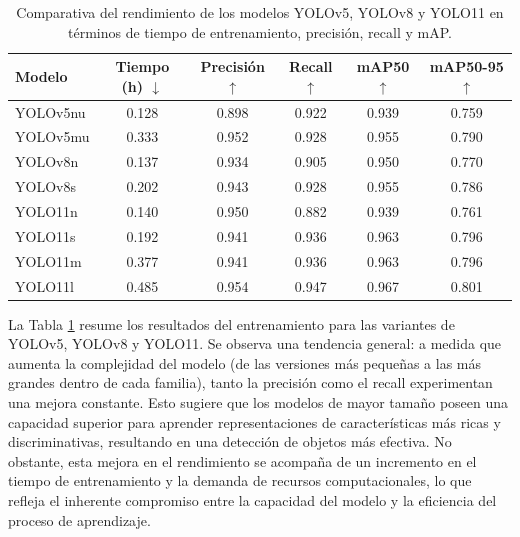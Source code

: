 \documentclass[11pt,spanish,listoffigures,listoftables]{tfgetsinf}
\begin{document}
\begin{table}[H]
   \centering
   \begin{tabular}{l | c | c | c | c | c}
      \toprule
      Modelo & Tiempo (h) $\downarrow$ & Precisión $\uparrow$ & Recall $\uparrow$ & mAP50 $\uparrow$ & mAP50-95 $\uparrow$ \\
      \midrule
      YOLOv5nu & 0.128 & 0.898 & 0.922 & 0.939 & 0.759 \\
      YOLOv5mu & 0.333 & 0.952 &  0.928 & 0.955 & 0.790 \\
      YOLOv8n & 0.137 & 0.934 & 0.905 & 0.950 & 0.770 \\
      YOLOv8s & 0.202 & 0.943 & 0.928 & 0.955 & 0.786 \\
      YOLO11n & 0.140 & 0.950 & 0.882 & 0.939 & 0.761 \\
      YOLO11s & 0.192 & 0.941 & 0.936 & 0.963 & 0.796 \\
      YOLO11m & 0.377 & 0.941 & 0.936 & 0.963 & 0.796 \\
      YOLO11l & 0.485 & 0.954 & 0.947 & 0.967 & 0.801 \\
      \bottomrule
   \end{tabular}
   \caption[Comparativa del rendimiento de los modelos YOLOv5, YOLOv8 y YOLO11 en términos de tiempo de entrenamiento, precisión, recall y mAP]{Comparativa del rendimiento de los modelos YOLOv5, YOLOv8 y YOLO11 en términos de tiempo de entrenamiento, precisión, recall y mAP.}
   \label{tab:modelos_metrics}
\end{table}

La Tabla \ref{tab:modelos_metrics} resume los resultados del entrenamiento para las variantes de YOLOv5, YOLOv8 y YOLO11. Se observa una tendencia general: a medida que aumenta la complejidad del modelo (de las versiones más pequeñas a las más grandes dentro de cada familia), tanto la precisión como el recall experimentan una mejora constante. Esto sugiere que los modelos de mayor tamaño poseen una capacidad superior para aprender representaciones de características más ricas y discriminativas, resultando en una detección de objetos más efectiva. No obstante, esta mejora en el rendimiento se acompaña de un incremento en el tiempo de entrenamiento y la demanda de recursos computacionales, lo que refleja el inherente compromiso entre la capacidad del modelo y la eficiencia del proceso de aprendizaje.
\end{document}
